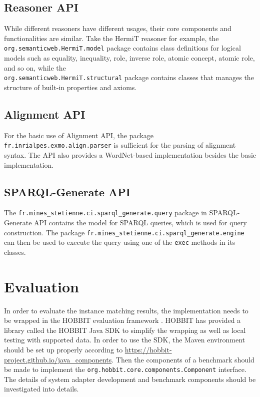 \subsection{Reasoner API}

While different reasoners have different usages, their core components and functionalities are similar. Take the HermiT reasoner for example, the \texttt{org.semanticweb.HermiT.model} package contains class definitions for logical models such as equality, inequality, role, inverse role, atomic concept, atomic role, and so on, while the \\
\texttt{org.semanticweb.HermiT.structural} package contains classes that manages the structure of built-in properties and axioms.

\subsection{Alignment API}

For the basic use of Alignment API, the package \texttt{fr.inrialpes.exmo.align.parser} is sufficient for the parsing of alignment syntax. The API also provides a WordNet-based implementation besides the basic implementation.

\subsection{SPARQL-Generate API}

The \texttt{fr.mines\_stetienne.ci.sparql\_generate.query} package in SPARQL-Generate API contains the model for SPARQL queries, which is used for query construction. The package \texttt{fr.mines\_stetienne.ci.sparql\_generate.engine} can then be used to execute the query using one of the \texttt{exec} methods in its classes.

\section{Evaluation}

In order to evaluate the instance matching results, the implementation needs to be wrapped in the HOBBIT evaluation framework \cite{}. HOBBIT has provided a library called the HOBBIT Java SDK to simplify the wrapping as well as local testing with supported data. In order to use the SDK, the Maven environment should be set up properly according to \url{https://hobbit-project.github.io/java_components}. Then the components of a benchmark should be made to implement the \texttt{org.hobbit.core.components.Component} interface. The details of system adapter development and benchmark components should be investigated into details.
